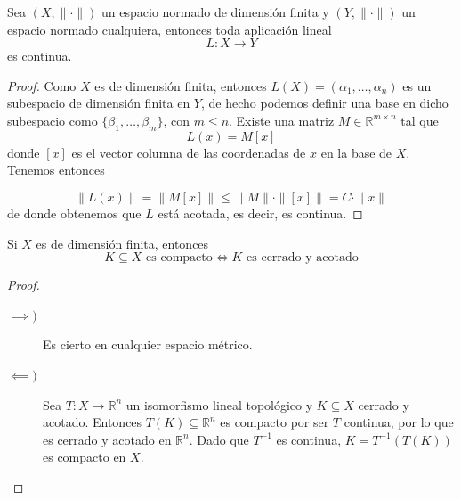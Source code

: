 \begin{coro}
    Sea $(X, \|\cdot\|)$ un espacio normado de dimensión finita y $(Y, \|\cdot\|)$ un espacio normado cualquiera, entonces toda aplicación lineal
    \begin{equation*}
        L: X \longrightarrow Y
    \end{equation*}
    es continua.

\begin{proof}
    Como $X$ es de dimensión finita, entonces $L(X)=(\alpha_1, \ldots, \alpha_n)$ es un subespacio de dimensión finita en $Y$, de hecho podemos definir una base en dicho subespacio como $\{\beta_1, \dots, \beta_m\}$, con $m \le n$. Existe una matriz $M\in \mathbb{R}^{m \times n}$ tal que 
    $$L(x) = M[x]$$
    donde $[x]$ es el vector columna de las coordenadas de $x$ en la base de $X$. Tenemos entonces

    \begin{equation*}
        \|L(x)\| = \|M[x]\| \leq \|M\| \cdot \|[x]\| = C \cdot \|x\|
    \end{equation*}
    de donde obtenemos que $L$ está acotada, es decir, es continua.
\end{proof}
\end{coro}

\begin{coro}\label{cor:compacto-cerrado-acotado}
    Si $X$ es de dimensión finita, entonces 
    \begin{equation*}
        K\subseteq X \text{ es compacto} \iff K \text{ es cerrado y acotado}
    \end{equation*}
\begin{proof}
    \begin{description}
        \item[$\implies)$] Es cierto en cualquier espacio métrico.
        \item[$\impliedby)$] Sea $T: X \to \mathbb{R}^n$ un isomorfismo lineal topológico y $K \subseteq X$ cerrado y acotado. Entonces $T(K) \subseteq \mathbb{R}^n$ es compacto por ser $T$ continua, por lo que es cerrado y acotado en $\mathbb{R}^n$. Dado que $T^{-1}$ es continua, $K = T^{-1}(T(K))$ es compacto en $X$.
    \end{description}
\end{proof}
\end{coro}

